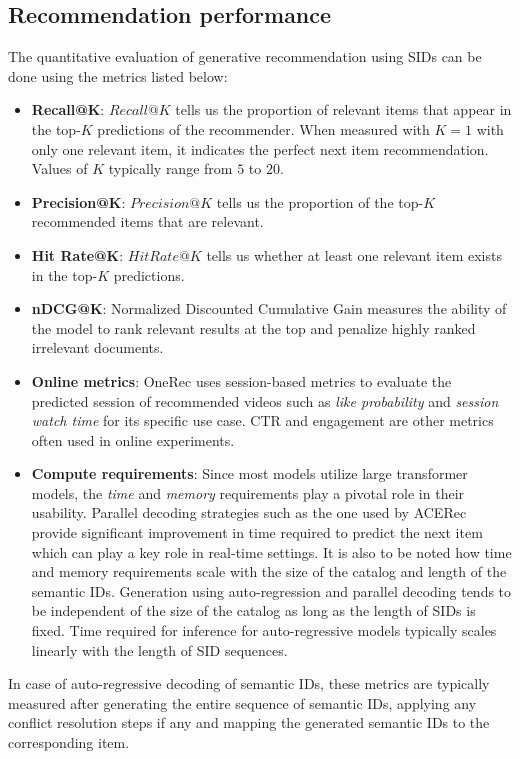 \documentclass[11pt,a4paper]{article}
\begin{document}
\subsection{Recommendation performance}
The quantitative evaluation of generative recommendation using SIDs can be done using the metrics listed below:

\begin{itemize}
    \item \textbf{Recall@K}: $Recall@K$ tells us the proportion of relevant items that appear in the top-$K$ predictions of the recommender. When measured with $K = 1$ with only one relevant item, it indicates the perfect next item recommendation. Values of $K$ typically range from $5$ to $20$.
    \item \textbf{Precision@K}: $Precision@K$ tells us the proportion of the top-$K$ recommended items that are relevant.
    \item \textbf{Hit Rate@K}: $Hit Rate@K$ tells us whether at least one relevant item exists in the top-$K$ predictions.
    \item \textbf{nDCG@K}: Normalized Discounted Cumulative Gain measures the ability of the model to rank relevant results at the top and penalize highly ranked irrelevant documents.
    \item \textbf{Online metrics}: OneRec \cite{2025OneRec_deng2025onerecunifyingretrieverank} uses session-based metrics to evaluate the predicted session of recommended videos such as \emph{like probability} and \emph{session watch time} for its specific use case. CTR and engagement are other metrics often used in online experiments.
    \item \textbf{Compute requirements}: Since most models utilize large transformer models, the \emph{time} and \emph{memory} requirements play a pivotal role in their usability. Parallel decoding strategies such as the one used by ACERec provide significant improvement in time required to predict the next item which can play a key role in real-time settings. It is also to be noted how time and memory requirements scale with the size of the catalog and length of the semantic IDs. Generation using auto-regression and parallel decoding tends to be independent of the size of the catalog as long as the length of SIDs is fixed. Time required for inference for auto-regressive models typically scales linearly with the length of SID sequences.
\end{itemize}

In case of auto-regressive decoding of semantic IDs, these metrics are typically measured after generating the entire sequence of semantic IDs, applying any conflict resolution steps if any and mapping the generated semantic IDs to the corresponding item.
\end{document}
